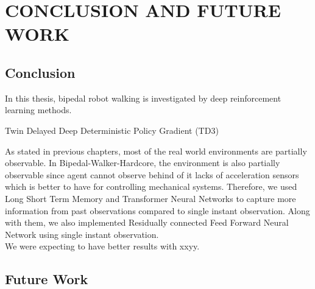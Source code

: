 \chapter{CONCLUSION AND FUTURE WORK}
\label{chap:conclusion}

\section{Conclusion}

In this thesis, bipedal robot walking is investigated by deep  reinforcement learning methods. 

Twin Delayed Deep Deterministic Policy Gradient (TD3) 

As stated in previous chapters, most of the real world environments are partially observable. In Bipedal-Walker-Hardcore, the environment is also partially observable since agent cannot observe behind of it lacks of acceleration sensors which is better to have for controlling mechanical systems. Therefore, we used Long Short Term Memory and Transformer Neural Networks to capture more information from past observations compared to single instant observation. Along with them, we also implemented Residually connected Feed Forward Neural Network using single instant observation. \\

We were expecting to have better results with xxyy.

\section{Future Work}

